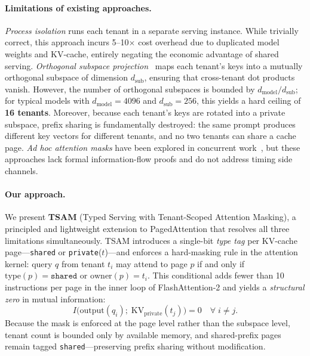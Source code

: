\documentclass[11pt]{article}
\begin{document}
\paragraph{Limitations of existing approaches.}
\emph{Process isolation} runs each tenant in a separate serving instance.
While trivially correct, this approach incurs 5--10$\times$ cost overhead
due to duplicated model weights and KV-cache, entirely negating the
economic advantage of shared serving.
\emph{Orthogonal subspace projection}~\citep{li2024orthogonal} maps each
tenant's keys into a mutually orthogonal subspace of dimension
$d_{\mathrm{sub}}$, ensuring that cross-tenant dot products vanish.
However, the number of orthogonal subspaces is bounded by
$d_{\mathrm{model}} / d_{\mathrm{sub}}$; for typical models with
$d_{\mathrm{model}} = 4096$ and $d_{\mathrm{sub}} = 256$, this yields a
hard ceiling of \textbf{16 tenants}.  Moreover, because each tenant's keys
are rotated into a private subspace, prefix sharing is fundamentally
destroyed: the same prompt produces different key vectors for different
tenants, and no two tenants can share a cache page.
\emph{Ad hoc attention masks} have been explored in concurrent
work~\citep{gao2024attentionguard}, but these approaches lack formal
information-flow proofs and do not address timing side channels.

\paragraph{Our approach.}
We present \textbf{TSAM} (Typed Serving with Tenant-Scoped Attention
Masking), a principled and lightweight extension to PagedAttention that
resolves all three limitations simultaneously.  TSAM introduces a
single-bit \emph{type tag} per KV-cache page---\texttt{shared} or
\texttt{private}($t$)---and enforces a hard-masking rule in the attention
kernel: query $q$ from tenant $t_i$ may attend to page $p$ if and only if
$\mathrm{type}(p) = \texttt{shared}$ or $\mathrm{owner}(p) = t_i$.  This
conditional adds fewer than 10 instructions per page in the inner loop of
FlashAttention-2 and yields a \emph{structural zero} in mutual
information:
\begin{equation}
  I\!\bigl(\mathrm{output}(q_i);\;\mathrm{KV}_{\mathrm{private}}(t_j)\bigr) = 0
  \quad \forall\; i \neq j.
  \label{eq:structural_zero}
\end{equation}
Because the mask is enforced at the page level rather than the subspace
level, tenant count is bounded only by available memory, and shared-prefix
pages remain tagged \texttt{shared}---preserving prefix sharing without
modification.
\end{document}
